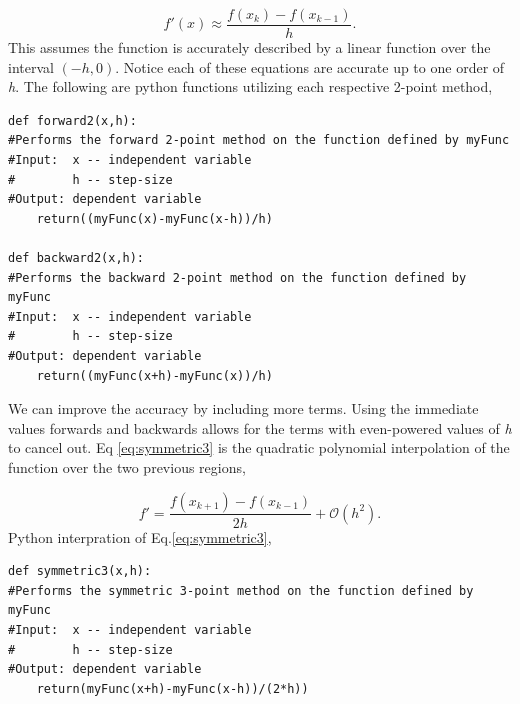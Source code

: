 \documentclass[10pt]{article}
\begin{document}
\begin{equation}
\label{eq:backward2}
	f'(x) \approx \frac{f(x_k)-f(x_{k-1})}{h}.
\end{equation}
This assumes the function is accurately described by a linear function over the interval $(-h,0)$. Notice each of these equations are accurate up to one order of \textit{h}. The following are python functions utilizing each respective 2-point method,
\begin{lstlisting}
def forward2(x,h):
#Performs the forward 2-point method on the function defined by myFunc
#Input:  x -- independent variable
#        h -- step-size
#Output: dependent variable
    return((myFunc(x)-myFunc(x-h))/h)

def backward2(x,h):
#Performs the backward 2-point method on the function defined by myFunc
#Input:  x -- independent variable
#        h -- step-size
#Output: dependent variable
    return((myFunc(x+h)-myFunc(x))/h)
\end{lstlisting}
    
We can improve the accuracy by including more terms. Using the immediate values forwards and backwards allows for the terms with even-powered values of \textit{h} to cancel out. Eq \ref{eq:symmetric3} is the quadratic polynomial interpolation of the function over the two previous regions,

\begin{equation}
\label{eq:symmetric3}
	f'=\frac{f(x_{k+1})-f(x_{k-1})}{2h} + \mathcal{O}(h^2).
\end{equation} 
Python interpration of Eq.\ref{eq:symmetric3},
\begin{lstlisting}
def symmetric3(x,h):
#Performs the symmetric 3-point method on the function defined by myFunc
#Input:  x -- independent variable
#        h -- step-size
#Output: dependent variable
    return(myFunc(x+h)-myFunc(x-h))/(2*h))
\end{lstlisting}
\end{document}
